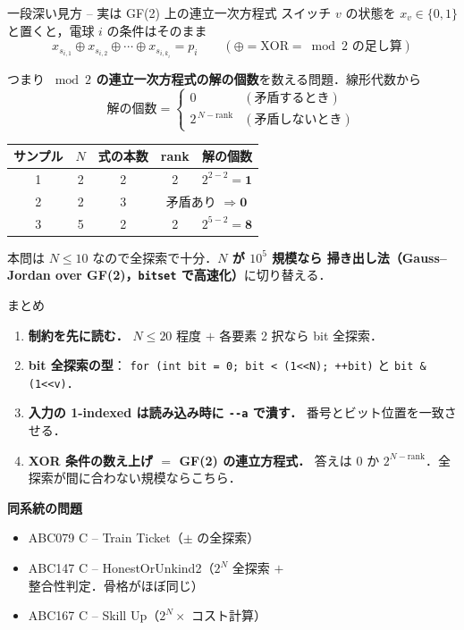 \documentclass[dvipdfmx,aspectratio=169]{beamer}
\begin{document}
\begin{frame}{一段深い見方 -- 実は GF(2) 上の連立一次方程式}
  スイッチ $v$ の状態を $x_v \in \{0,1\}$ と置くと，電球 $i$ の条件はそのまま
  \[
    x_{s_{i,1}} \oplus x_{s_{i,2}} \oplus \cdots \oplus x_{s_{i,k_i}} = p_i
    \qquad (\oplus = \text{XOR} = \bmod 2 \text{ の足し算})
  \]

  つまり \textbf{$\bmod 2$ の連立一次方程式の解の個数}を数える問題．線形代数から
  \[
    \text{解の個数} =
    \begin{cases}
      0 & (\text{矛盾するとき})\\[2pt]
      2^{\,N - \mathrm{rank}} & (\text{矛盾しないとき})
    \end{cases}
  \]

  \vspace{0.3em}
  \centering
  \begin{tabular}{ccccc}
    \toprule
    サンプル & $N$ & 式の本数 & rank & 解の個数\\
    \midrule
    1 & 2 & 2 & 2 & $2^{2-2} = \mathbf{1}$\\
    2 & 2 & 3 & \multicolumn{2}{c}{矛盾あり $\Rightarrow \mathbf{0}$}\\
    3 & 5 & 2 & 2 & $2^{5-2} = \mathbf{8}$\\
    \bottomrule
  \end{tabular}

  \vspace{0.6em}
  \raggedright
  {\small 本問は $N \le 10$ なので全探索で十分．\textbf{$N$ が $10^5$ 規模なら
  掃き出し法（Gauss--Jordan over GF(2)，\texttt{bitset} で高速化）}に切り替える．}
\end{frame}

\begin{frame}[fragile]{まとめ}
  \begin{enumerate}
    \item \textbf{制約を先に読む．} $N \le 20$ 程度 $+$ 各要素 2 択なら bit 全探索．
    \item \textbf{bit 全探索の型}：
      \verb|for (int bit = 0; bit < (1<<N); ++bit)| と \verb|bit & (1<<v)|．
    \item \textbf{入力の 1-indexed は読み込み時に \texttt{-{}-a} で潰す．}
      番号とビット位置を一致させる．
    \item \textbf{XOR 条件の数え上げ $=$ GF(2) の連立方程式．}
      答えは $0$ か $2^{N-\mathrm{rank}}$．全探索が間に合わない規模ならこちら．
  \end{enumerate}

  \vspace{0.8em}
  \textbf{同系統の問題}
  \begin{itemize}
    \item ABC079 C -- Train Ticket（$\pm$ の全探索）
    \item ABC147 C -- HonestOrUnkind2（$2^N$ 全探索 $+$ 整合性判定．骨格がほぼ同じ）
    \item ABC167 C -- Skill Up（$2^N \times$ コスト計算）
  \end{itemize}
\end{frame}
\end{document}

